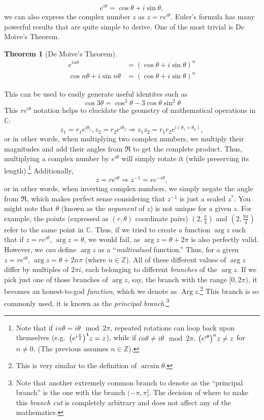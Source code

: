 \documentclass[10pt]{scrartcl}
\numberwithin{equation}{subsection}
\theoremstyle{definition}
\newtheorem{theorem}{Theorem}[section]
\theoremstyle{remark}
\newenvironment{theoremSR}
	{
		\begin{siderules}
			\begin{theorem}
			}
			{
			\end{theorem}
		\end{siderules}
	}
\newcommand{\Complex}{\mathbb{C}}
\newcommand{\Integers}{\mathbb{Z}}
\newcommand{\inv}[1]{
		{#1}^{-1}
	}
\newcommand*{\conj}[1]{{#1}^*}
\DeclareMathOperator{\Arg}{Arg}
\begin{document}
\[
	e^{i \theta} = \cos{\theta} + i \sin{\theta},
\]
we can also express the complex number $z$ as $z=r e^{i \theta}$.
Euler's formula has many powerful results that are quite simple to derive. One
of the most trivial is De Moive's Theorem.
\begin{theoremSR}[De Moive's Theorem]
	\begin{align*}
		e^{in\theta} &= (\cos{\theta} + i \sin{\theta})^n \\
		\cos{n\theta} + i \sin{n\theta} &= (\cos{\theta} + i \sin{\theta})^n
	\end{align*}
\end{theoremSR}
This can be used to easily generate useful identites such as 
\[
	\cos{3\theta} = \cos^3{\theta} - 3\cos{\theta}\sin^2{\theta}
\]
This $re^{i\theta}$ notation helps to elucidate the geometry of mathematical
operations in $\Complex$: 
\[
	z_1=r_1 e^{i\theta_1}, z_2=r_2 e^{i\theta_2}
	\Rightarrow z_1 z_2 = r_1 r_2 e^{i(\theta_1 + \theta_2)},
\]
 or in other words,
when multiplying two complex numbers, we multiply their magnitudes and 
add their angles from $\Re$ to get the complete product. Thus, multiplying
a complex number by $e^{i\theta}$ will simply rotate it (while preserving its
length).\footnote{Note that if $in\theta = i\theta \mod 2\pi$, repeated
rotations can loop back upon themselves (e.g.\ $\pqty{e^{i\frac{\pi}{2}}}^4 z =
z$), while if $in\theta \neq i\theta \mod 2\pi$, $\pqty{e^{i\theta}}^n z\neq z$
for $n\neq0$. (The previous assumes $n\in\mathbb{Z}$).} Additionally,
\[z=re^{i\theta} \Rightarrow \inv{z} = re^{-i\theta},\]
or in other words, when inverting complex numbers, we simply negate the angle
from $\Re$, which makes perfect sense considering that $\inv{z}$ is just a
scaled $\conj{z}$. 
\label{argument}
You might note that $\theta$ (known as the \textit{argument} of $z$)
is not unique for a given $z$. For example,
the points (expressed as $(r,\theta)$ coordinate pairs)
$(2, \frac{\pi}{4})$ and $(2, \frac{9\pi}{4})$ refer to the same point in 
$\Complex$. Thus, if we tried to create a function $\arg{z}$ such that
if $z=re^{i \theta}$, $\arg{z} = \theta$,
we would fail, as $\arg{z} = \theta + 2 \pi$ 
is also perfectly valid.
However, we \emph{can} define $\arg{z}$ as a ``\textit{multivalued}
function.''
Thus, for a given $z=re^{i\theta}$, $\arg{z} = \theta + 2n\pi$
(where $n \in \Integers$).
All of these different values of $\arg z$ differ by multiples of $2\pi i$, 
each belonging to different \textit{branches} of the $\arg z$.
If we pick just one of those branches of $\arg{z}$, say,
the branch with the range $[0, 2\pi)$, 
it becomes an honest-to-god \emph{function}, which we denote as
$\Arg{z}$.\footnote{This
is very similar to the definition of $\arcsin \theta$.}
This branch is so commonly used, it is known as the 
\textit{principal branch}.\footnote{Note that another extremely common branch
	to denote as the ``principal branch'' is the one with the branch
$(-\pi,\pi]$. The decision of where to make this \textit{branch cut} is 
completely arbitrary and does not affect any of the mathematics.}
\end{document}

